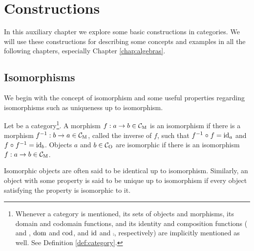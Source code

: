 \chapter{Constructions}
\label{chap:constructions}

In this auxiliary chapter we explore some basic constructions in
categories. We will use these constructions for describing some
concepts and examples in all the following chapters, especially
Chapter \ref{chap:algebras}.

\section{Isomorphisms}
\label{sec:constructions-isomorphisms}

We begin with the concept of isomorphism and some useful properties
regarding isomorphisms such as uniqueness up to isomorphism.

\begin{definition}


  \label{def:isomorphism}


  Let  be a category\footnote{Whenever a category  is
    mentioned, its sets of objects and morphisms, its domain and
    codomain functions, and its identity and composition functions
    ( and , $\operatorname{dom}$ and $\operatorname{cod}$, and $\operatorname{id}$ and $\comp$,
    respectively) are implicitly mentioned as well. See Definition
    \ref{def:category}.}. A morphism $f: a \to b \in \mathcal{C}_{\operatorname{M}}$ is an
  isomorphism if there is a morphism $f^{-1}: b \to a \in \mathcal{C}_{\operatorname{M}}$,
  called the inverse of $f$, such that $f^{-1} \mathrel{\circ} f = \operatorname{id}_{a}$ and
  $f \mathrel{\circ} f^{-1} = \operatorname{id}_{b}$. Objects $a$ and $b \in \mathcal{C}_{\operatorname{O}}$ are
  isomorphic if there is an isomorphism $f: a \to b \in \mathcal{C}_{\operatorname{M}}$.

\end{definition}

\begin{definition}


  \label{def:up-to-isomorphism}


  Isomorphic objects are often said to be identical up to isomorphism.
  Similarly, an object with some property is said to be unique up to
  isomorphism if every object satisfying the property is isomorphic to
  it.

\end{definition}

